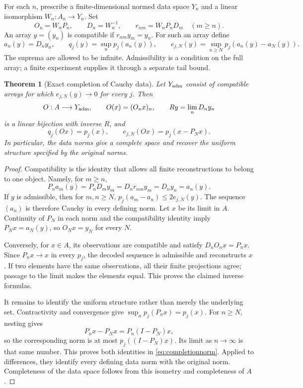 \documentclass[11pt,a4paper]{amsart}
\numberwithin{equation}{section}
\newtheorem{theorem}{Theorem}[section]
\theoremstyle{definition}
\theoremstyle{remark}
\begin{document}
For each $n$, prescribe a finite-dimensional normed data space $Y_n$ and a linear isomorphism $W_n:A_n\to Y_n$. Set
\[
 O_n=W_nP_n,\qquad D_n=W_n^{-1},\qquad
 r_{nm}=W_nP_nD_m\quad(m\ge n).
\]
An array $y=(y_n)$ is compatible if $r_{nm}y_m=y_n$. For such an array define
\begin{equation}\label{eq:finitecauchy}
 a_n(y)=D_ny_n,\qquad
 q_j(y)=\sup_n p_j(a_n(y)),\qquad
 e_{j,N}(y)=\sup_{n\ge N}p_j(a_n(y)-a_N(y)).
\end{equation}
The suprema are allowed to be infinite. Admissibility is a condition on the full array; a finite experiment supplies it through a separate tail bound.

\begin{theorem}[Exact completion of Cauchy data]\label{thm:completion}
Let $Y_{\rm adm}$ consist of compatible arrays for which $e_{j,N}(y)\to0$ for every $j$. Then
\begin{equation}\label{eq:completionmap}
 O:A\longrightarrow Y_{\rm adm},\qquad O(x)=(O_nx)_n,
 \qquad Ry=\lim_nD_ny_n
\end{equation}
is a linear bijection with inverse $R$, and
\begin{equation}\label{eq:completionnorm}
 q_j(Ox)=p_j(x),\qquad e_{j,N}(Ox)=p_j(x-P_Nx).
\end{equation}
In particular, the data norms give a complete space and recover the uniform structure specified by the original norms.
\end{theorem}
\begin{proof}
Compatibility is the identity that allows all finite reconstructions to belong to one object. Namely, for $m\ge n$,
\[
 P_n a_m(y)=P_nD_my_m=D_nr_{nm}y_m=D_ny_n=a_n(y).
\]
If $y$ is admissible, then for $m,n\ge N$,
$p_j(a_m-a_n)\le2e_{j,N}(y)$. The sequence $(a_n)$ is therefore Cauchy in every defining norm. Let $x$ be its limit in $A$. Continuity of $P_N$ in each norm and the compatibility identity imply $P_Nx=a_N(y)$, so $O_Nx=y_N$ for every $N$.

Conversely, for $x\in A$, its observations are compatible and satisfy $D_nO_nx=P_nx$. Since $P_nx\to x$ in every $p_j$, the decoded sequence is admissible and reconstructs $x$. If two elements have the same observations, all their finite projections agree; passage to the limit makes the elements equal. This proves the claimed inverse formulas.

It remains to identify the uniform structure rather than merely the underlying set. Contractivity and convergence give
$\sup_n p_j(P_nx)=p_j(x)$. For $n\ge N$, nesting gives
\[
 P_nx-P_Nx=P_n(I-P_N)x,
\]
so the corresponding norm is at most $p_j((I-P_N)x)$. Its limit as $n\to\infty$ is that same number. This proves both identities in \eqref{eq:completionnorm}. Applied to differences, they identify every defining data norm with the original norm. Completeness of the data space follows from this isometry and completeness of $A$.
\end{proof}
\end{document}
